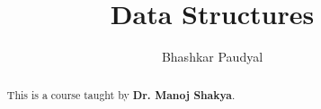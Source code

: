 \documentclass[a4paper, 11pt]{report}
\author{Bhashkar Paudyal}
\title{Data Structures}
\begin{document}
\maketitle
\begin{abstract}
  This is a course taught by \textbf{Dr. Manoj Shakya}.
\end{abstract}
\newpage
\tableofcontents
\lstlistoflistings 
\listoffigures

\newpage
\appendix
\appendixpage{}

\newpage
\pagestyle{plain}
\printbibliography{}
\end{document}
